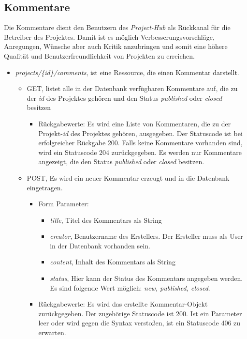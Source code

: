 \documentclass[12pt]{scrartcl}
\begin{document}
\subsection{Kommentare}
	Die Kommentare dient den Benutzern des \emph{Project-Hub} als Rückkanal für die Betreiber des Projektes. Damit ist es möglich Verbesserungsvorschläge, Anregungen, Wünsche aber auch Kritik anzubringen und somit eine höhere Qualität und Benutzerfreundlichkeit von Projekten zu erreichen.  
	\begin{itemize}
		\item \emph {projects/\{id\}/comments}, ist eine Ressource, die einen Kommentar darstellt.
		\begin{itemize}
			\item GET, listet alle in der Datenbank verfügbaren Kommentare auf, die zu der \emph{id} des Projektes gehören und  den Status \emph{published} oder \emph{closed} besitzen
			\begin{itemize}
				\item Rückgabewerte: Es wird eine Liste von Kommentaren, die zu der Projekt-\emph{id} des Projektes gehören, ausgegeben. Der Statuscode ist bei erfolgreicher Rückgabe 200. Falls keine Kommentare vorhanden sind, wird ein Statuscode 204 zurückgegeben. Es werden nur Kommentare angezeigt, die den Status \emph{published} oder \emph{closed} besitzen.
			\end{itemize}
					\item POST, Es wird ein neuer Kommentar erzeugt und in die Datenbank eingetragen.
					\begin{itemize}
						\item Form Parameter:
						\begin{itemize}
							\item  \emph{title}, Titel des Kommentars als String
							\item  \emph{creator}, Benutzername des Erstellers. Der Ersteller muss als User in der Datenbank vorhanden sein.
							\item  \emph{content}, Inhalt des Kommentars als String
							\item  \emph{status}, Hier kann der Status des Kommentars angegeben werden. Es sind folgende Wert möglich: \emph{new, published, closed}.
						\end{itemize}
						\item Rückgabewerte: Es wird das erstellte Kommentar-Objekt zurückgegeben. Der zugehörige Statuscode ist 200. Ist ein Parameter leer oder wird gegen die Syntax verstoßen, ist ein Statuscode 406 zu erwarten.  

\end{itemize}
\end{itemize}
\end{itemize}
\end{document}
